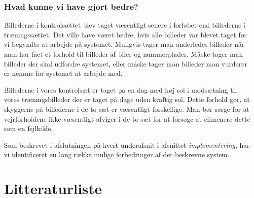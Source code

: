 \documentclass[11pt,a4paper,final]{article}
\begin{document}
\subsubsection*{Hvad kunne vi have gjort bedre?}
Billederne i kontrolsættet blev taget væsentligt senere i forløbet end billederne i træningssættet. Det ville have været bedre, hvis alle billeder var blevet taget før vi begyndte at arbejde på systemet. Muligvis tager man anderledes billeder når man har fået et forhold til billeder af biler og nummerplader. Måske tager man billeder der skal udfordre systemet, eller måske tager man billeder man vurderer er nemme for systemet at arbejde med.

Billederne i vores kontrolsæt er taget på en dag med høj sol i modsætning til vores træningsbilleder der er taget på dage uden kraftig sol. Dette forhold gør, at skyggerne på billederne i de to sæt er væsentligt forskellige. Man bør sørge for at vejrforholdene ikke væsentligt afviger i de to sæt for at forsøge at elimenere dette som en fejlkilde.

Som beskrevet i afslutningen på hvert underafsnit i afsnittet \textit{implementering}, har vi identificeret en lang række mulige forbedringer af det beskrevne system. 




\newpage %
\section{Litteraturliste}
\end{document}
